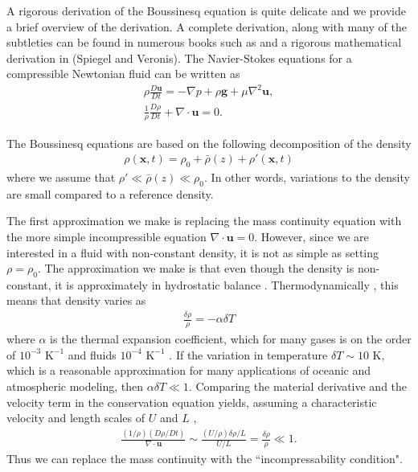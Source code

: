 A rigorous derivation of the Boussinesq equation is quite delicate and we provide a brief overview of the derivation. A complete derivation, along with many of the subtleties can be found in numerous books such as \cite{kundu,tritton,vallis} and a rigorous mathematical derivation in (Spiegel and Veronis). The Navier-Stokes equations for a compressible Newtonian fluid can be written as
\begin{align}
\rho \frac{D\bm{u}}{Dt} = -\nabla p + \rho \textbf{g} + \mu \nabla^{2}\bm{u},\\
\frac{1}{\rho}\frac{D\rho}{Dt} + \nabla \cdot \bm{u}=0.
\end{align}

The Boussinesq equations are based on the following decomposition of the density \cite{kundu,vallis}
\begin{align}
\rho(\bm{x},t) = \rho_{0} + \bar{\rho}(z) + \rho'(\bm{x},t) 
\end{align}
where we assume that $\rho' \ll \bar{\rho}(z) \ll \rho_{0}$. In other words, variations to the density are small compared to a reference density.

The first approximation we make is replacing the mass continuity equation with the more simple incompressible equation $\nabla\cdot \bm{u}=0$. However,  since we are interested in a fluid with non-constant density, it is not as simple as setting $\rho=\rho_{0}$. The approximation we make is that even though the density is non-constant, it is approximately in hydrostatic balance \cite{vallis}. Thermodynamically \cite{kundu}, this means that density varies as
\begin{align}
\frac{\delta \rho}{\rho} = - \alpha \delta T
\end{align} 
where $\alpha$ is the thermal expansion coefficient, which for many gases is on the order of $10^{-3} \text{ K}^{-1}$ and fluids $10^{-4} \text{ K}^{-1}$ \cite{kundu}. If the variation in temperature $\delta T \sim 10 \text{ K}$, which is a reasonable approximation for many applications of oceanic and atmospheric modeling, then $\alpha \delta T\ll 1$. Comparing the material derivative and the velocity term in the conservation equation yields, assuming a characteristic velocity and length scales of $U$ and $L$ \cite{kundu}, 
\begin{align}
\frac{(1/\rho)(D\rho/Dt)}{\nabla \cdot\textbf{u}} \sim \frac{(U/\rho)\delta \rho / L}{U/L}  = \frac{\delta\rho}{\rho} \ll 1.
\end{align}
Thus we can replace the mass continuity with the ``incompressability condition". 

